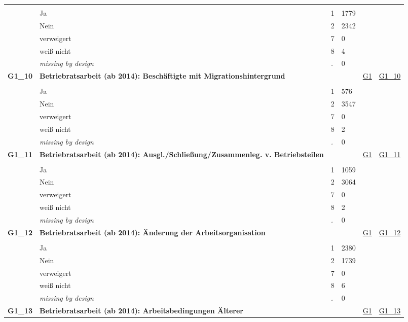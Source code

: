 \begin{longtable}{| L{2.45cm} | L{6cm} | C{1.5cm} | R{1cm} | C{2.25cm} | C{2.25cm} |}
   &  &  &  &  &  \\ 
   & Ja & 1 & 1779 &  &  \\ 
   & Nein & 2 & 2342 &  &  \\ 
   & verweigert & 7 & 0 &  &  \\ 
   & weiß nicht & 8 & 4 &  &  \\ 
   & \textit{missing by design} & \textit{.} & 0 &  &  \\ 
   \midrule
\textbf{G1\_10}\label{var:G1:10} & \textbf{Betriebratsarbeit (ab 2014): Beschäftigte mit Migrationshintergrund} &  &  & \hyperref[G1]{G1} & \hyperref[var:suf:G1:10]{G1\_10} \\ 
   &  &  &  &  &  \\ 
   & Ja & 1 & 576 &  &  \\ 
   & Nein & 2 & 3547 &  &  \\ 
   & verweigert & 7 & 0 &  &  \\ 
   & weiß nicht & 8 & 2 &  &  \\ 
   & \textit{missing by design} & \textit{.} & 0 &  &  \\ 
   \midrule
\textbf{G1\_11}\label{var:G1:11} & \textbf{Betriebratsarbeit (ab 2014): Ausgl./Schließung/Zusammenleg. v. Betriebsteilen} &  &  & \hyperref[G1]{G1} & \hyperref[var:suf:G1:11]{G1\_11} \\ 
   &  &  &  &  &  \\ 
   & Ja & 1 & 1059 &  &  \\ 
   & Nein & 2 & 3064 &  &  \\ 
   & verweigert & 7 & 0 &  &  \\ 
   & weiß nicht & 8 & 2 &  &  \\ 
   & \textit{missing by design} & \textit{.} & 0 &  &  \\ 
   \midrule
\textbf{G1\_12}\label{var:G1:12} & \textbf{Betriebratsarbeit (ab 2014): Änderung der Arbeitsorganisation} &  &  & \hyperref[G1]{G1} & \hyperref[var:suf:G1:12]{G1\_12} \\ 
   &  &  &  &  &  \\ 
   & Ja & 1 & 2380 &  &  \\ 
   & Nein & 2 & 1739 &  &  \\ 
   & verweigert & 7 & 0 &  &  \\ 
   & weiß nicht & 8 & 6 &  &  \\ 
   & \textit{missing by design} & \textit{.} & 0 &  &  \\ 
   \midrule
\textbf{G1\_13}\label{var:G1:13} & \textbf{Betriebratsarbeit (ab 2014): Arbeitsbedingungen Älterer} &  &  & \hyperref[G1]{G1} & \hyperref[var:suf:G1:13]{G1\_13} \\ 

\end{longtable}
